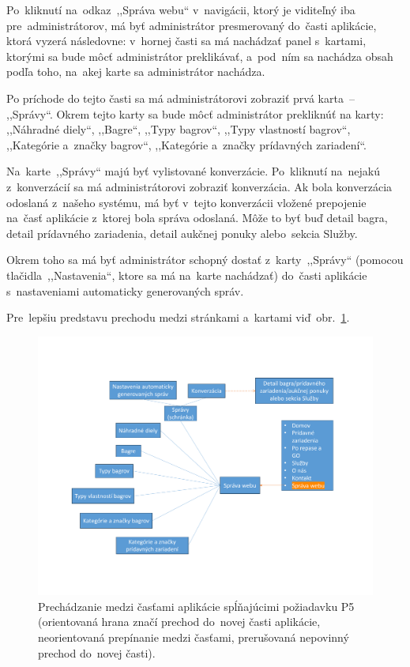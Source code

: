 Po~kliknutí na~odkaz~,,Správa webu`` v~navigácii, ktorý je viditeľný iba pre~administrátorov, má byť administrátor presmerovaný do~časti aplikácie, ktorá vyzerá následovne: v~hornej časti sa má nachádzať panel s~kartami, ktorými sa bude môcť administrátor preklikávať, a~pod~ním sa nachádza obsah podľa toho, na~akej karte sa administrátor nachádza.

Po príchode do tejto časti sa má administrátorovi zobraziť prvá karta~-- ,,Správy``. Okrem tejto karty sa bude môcť administrátor prekliknúť na karty: ,,Náhradné diely``, ,,Bagre``, ,,Typy bagrov``, ,,Typy vlastností bagrov``, ,,Kategórie a~značky bagrov``, ,,Kategórie a~značky prídavných zariadení``.

Na~karte~,,Správy`` majú byť vylistované konverzácie. Po~kliknutí na~nejakú z~konverzácií sa má administrátorovi zobraziť konverzácia. Ak bola konverzácia odoslaná z~našeho systému, má byť v~tejto konverzácii vložené prepojenie na~časť aplikácie z~ktorej bola správa odoslaná. Môže to byť buď detail bagra, detail prídavného zariadenia, detail aukčnej ponuky alebo~sekcia Služby.

Okrem toho sa má byť administrátor schopný dostať z~karty~,,Správy`` (pomocou tlačidla~,,Nastavenia``, ktore sa má na~karte nachádzať) do~časti aplikácie s~nastaveniami automaticky generovaných správ.

Pre~lepšiu predstavu prechodu medzi stránkami a~kartami viď~obr.~\ref{p5 p7 a sprava predmetov graph}.

\begin{figure}[H]\centering
\includegraphics[width=140mm]{../img/UI concept/p5 p7 a sprava predmetov graph}
\caption{Prechádzanie medzi časťami aplikácie spĺňajúcimi požiadavku P5 (orientovaná hrana značí prechod do~novej časti aplikácie, neorientovaná prepínanie medzi časťami, prerušovaná nepovinný prechod do~novej časti).}
\label{p5 p7 a sprava predmetov graph}
\end{figure}

